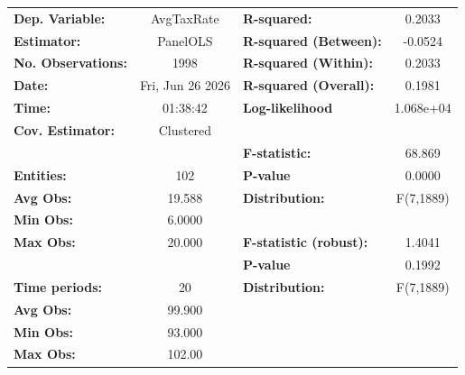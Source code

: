 \begin{center}
\begin{tabular}{lclc}
\toprule
\textbf{Dep. Variable:}                       &     AvgTaxRate     & \textbf{  R-squared:         }   &      0.2033      \\
\textbf{Estimator:}                           &      PanelOLS      & \textbf{  R-squared (Between):}  &     -0.0524      \\
\textbf{No. Observations:}                    &        1998        & \textbf{  R-squared (Within):}   &      0.2033      \\
\textbf{Date:}                                &  Fri, Jun 26 2026  & \textbf{  R-squared (Overall):}  &      0.1981      \\
\textbf{Time:}                                &      01:38:42      & \textbf{  Log-likelihood     }   &    1.068e+04     \\
\textbf{Cov. Estimator:}                      &     Clustered      & \textbf{                     }   &                  \\
\textbf{}                                     &                    & \textbf{  F-statistic:       }   &      68.869      \\
\textbf{Entities:}                            &        102         & \textbf{  P-value            }   &      0.0000      \\
\textbf{Avg Obs:}                             &       19.588       & \textbf{  Distribution:      }   &    F(7,1889)     \\
\textbf{Min Obs:}                             &       6.0000       & \textbf{                     }   &                  \\
\textbf{Max Obs:}                             &       20.000       & \textbf{  F-statistic (robust):} &      1.4041      \\
\textbf{}                                     &                    & \textbf{  P-value            }   &      0.1992      \\
\textbf{Time periods:}                        &         20         & \textbf{  Distribution:      }   &    F(7,1889)     \\
\textbf{Avg Obs:}                             &       99.900       & \textbf{                     }   &                  \\
\textbf{Min Obs:}                             &       93.000       & \textbf{                     }   &                  \\
\textbf{Max Obs:}                             &       102.00       & \textbf{                     }   &                  \\

\end{tabular}
\end{center}
